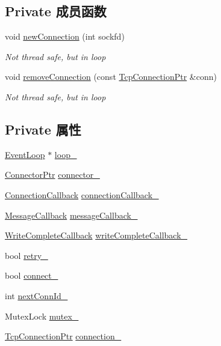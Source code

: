 \subsection*{Private 成员函数}
\begin{DoxyCompactItemize}
\item 
void \hyperlink{classmuduo_1_1TcpClient_ae2e5d102f7a519e65019cd5f09acea72}{new\+Connection} (int sockfd)
\begin{DoxyCompactList}\small\item\em Not thread safe, but in loop \end{DoxyCompactList}\item 
void \hyperlink{classmuduo_1_1TcpClient_ad9661c3f05443256c9439f812d1a7691}{remove\+Connection} (const \hyperlink{namespacemuduo_a40c45128e9700d337d92f3cbb8dd4a0a}{Tcp\+Connection\+Ptr} \&conn)
\begin{DoxyCompactList}\small\item\em Not thread safe, but in loop \end{DoxyCompactList}\end{DoxyCompactItemize}
\subsection*{Private 属性}
\begin{DoxyCompactItemize}
\item 
\hyperlink{classmuduo_1_1EventLoop}{Event\+Loop} $\ast$ \hyperlink{classmuduo_1_1TcpClient_a19968f50018d32ac31f5cba0195591ac}{loop\+\_\+}
\item 
\hyperlink{namespacemuduo_a144f8adea97b4c9ac75c439f6d87ae29}{Connector\+Ptr} \hyperlink{classmuduo_1_1TcpClient_afacaad877efe5e2f583f9c03a22166c8}{connector\+\_\+}
\item 
\hyperlink{namespacemuduo_ac7f7b0c9c9e96123dfea3fe120a2c404}{Connection\+Callback} \hyperlink{classmuduo_1_1TcpClient_ae4ac7fea1abbcfb56d481dbe8ffb37e7}{connection\+Callback\+\_\+}
\item 
\hyperlink{namespacemuduo_ab8a96fa483cffe150618e01058e6fc1b}{Message\+Callback} \hyperlink{classmuduo_1_1TcpClient_aa4d5ea21d215329779698e634e5e7755}{message\+Callback\+\_\+}
\item 
\hyperlink{namespacemuduo_a605eda27d048a69607942b95735d7087}{Write\+Complete\+Callback} \hyperlink{classmuduo_1_1TcpClient_a525f0d11cfa2e271600caa30407b6150}{write\+Complete\+Callback\+\_\+}
\item 
bool \hyperlink{classmuduo_1_1TcpClient_ae072450f4c07a3dbceed969b99c8df7f}{retry\+\_\+}
\item 
bool \hyperlink{classmuduo_1_1TcpClient_ab4b9ce5dfde7fe6c5954a376aac00190}{connect\+\_\+}
\item 
int \hyperlink{classmuduo_1_1TcpClient_aab950be51cdd74cb0fc104fa135e4853}{next\+Conn\+Id\+\_\+}
\item 
Mutex\+Lock \hyperlink{classmuduo_1_1TcpClient_a6e1bf1809a42f40f1a21178dc6620a6f}{mutex\+\_\+}
\item 
\hyperlink{namespacemuduo_a40c45128e9700d337d92f3cbb8dd4a0a}{Tcp\+Connection\+Ptr} \hyperlink{classmuduo_1_1TcpClient_a0d47bb0fac19c8a5d569761e100a0a47}{connection\+\_\+}
\end{DoxyCompactItemize}


